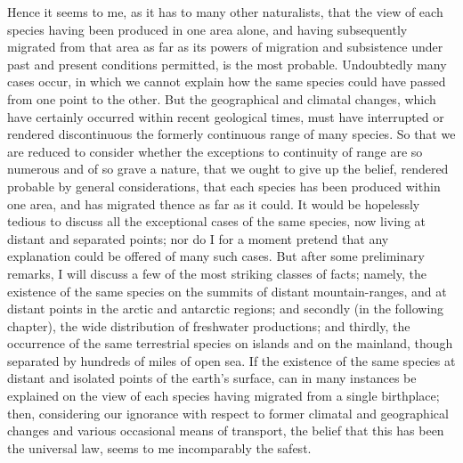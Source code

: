 \indent Hence it seems to me, as it has to many other naturalists, that the view of each species having been produced in one area alone, and having subsequently migrated from that area as far as its powers of migration and subsistence under past and present conditions permitted, is the most probable.  Undoubtedly many cases occur, in which we cannot explain how the same species could have passed from one point to the other. But the geographical and climatal changes, which have certainly occurred within recent geological times, must have interrupted or rendered discontinuous the formerly continuous range of many species.  So that we are reduced to consider whether the exceptions to continuity of range are so numerous and of so grave a nature, that we ought to give up the belief, rendered probable by general considerations, that each species has been produced within one area, and has migrated thence as far as it could. It would be hopelessly tedious to discuss all the exceptional cases of the same species, now living at distant and separated points; nor do I for a moment pretend that any explanation could be offered of many such cases.  But after some preliminary remarks, I will discuss a few of the most striking classes of facts; namely, the existence of the same species on the summits of distant mountain-ranges, and at distant points in the arctic and antarctic regions; and secondly (in the following chapter), the wide distribution of freshwater productions; and thirdly, the occurrence of the same terrestrial species on islands and on the mainland, though separated by hundreds of miles of open sea. If the existence of the same species at distant and isolated points of the earth's surface, can in many instances be explained on the view of each species having migrated from a single birthplace; then, considering our ignorance with respect to former climatal and geographical changes and various occasional means of transport, the belief that this has been the universal law, seems to me incomparably the safest.~\\
